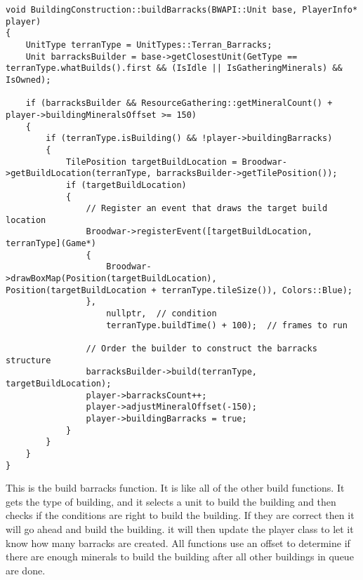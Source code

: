 \documentclass[10pt,letterpaper,onecolumn,draftclsnofoot]{IEEEtran}
\begin{document}
\begin{lstlisting}
void BuildingConstruction::buildBarracks(BWAPI::Unit base, PlayerInfo* player)
{
	UnitType terranType = UnitTypes::Terran_Barracks;
	Unit barracksBuilder = base->getClosestUnit(GetType == terranType.whatBuilds().first && (IsIdle || IsGatheringMinerals) && IsOwned);

	if (barracksBuilder && ResourceGathering::getMineralCount() + player->buildingMineralsOffset >= 150)
	{
		if (terranType.isBuilding() && !player->buildingBarracks)
		{
			TilePosition targetBuildLocation = Broodwar->getBuildLocation(terranType, barracksBuilder->getTilePosition());
			if (targetBuildLocation)
			{
				// Register an event that draws the target build location
				Broodwar->registerEvent([targetBuildLocation, terranType](Game*)
				{
					Broodwar->drawBoxMap(Position(targetBuildLocation), Position(targetBuildLocation + terranType.tileSize()), Colors::Blue);
				},
					nullptr,  // condition
					terranType.buildTime() + 100);  // frames to run

				// Order the builder to construct the barracks structure
				barracksBuilder->build(terranType, targetBuildLocation);
				player->barracksCount++;
				player->adjustMineralOffset(-150);
				player->buildingBarracks = true;
			}
		}
	}
}
\end{lstlisting}
This is the build barracks function. It is like all of the other build functions. It gets the type of building, and it selects a unit to build the building and then checks if the conditions are right to build the building. If they are correct then it will go ahead and build the building. it will then update the player class to let it know how many barracks are created. All functions use an offset to determine if there are enough minerals to build the building after all other buildings in queue are done.
\end{document}
